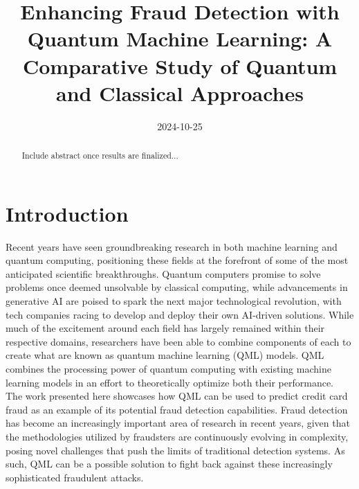 \documentclass[11pt, oneside]{article}   	%
\title{Enhancing Fraud Detection with Quantum Machine Learning: A Comparative Study of Quantum and Classical Approaches}
\author{}
\date{2024-10-25}							%
\begin{document}
\maketitle




\begin{abstract}
Include abstract once results are finalized...
\end{abstract}




\section{Introduction}

\hspace{10mm}Recent years have seen groundbreaking research in both machine learning and quantum computing, positioning these fields at the forefront of some of the most anticipated scientific breakthroughs. Quantum computers promise to solve problems once deemed unsolvable by classical computing, while advancements in generative AI are poised to spark the next major technological revolution, with tech companies racing to develop and deploy their own AI-driven solutions. While much of the excitement around each field has largely remained within their respective domains, researchers have been able to combine components of each to create what are known as quantum machine learning (QML) models. QML combines the processing power of quantum computing with existing machine learning models in an effort to theoretically optimize both their performance.\\

\noindent\hspace{10mm}The work presented here showcases how QML can be used to predict credit card fraud as an example of its potential fraud detection capabilities. Fraud detection has become an increasingly important area of research in recent years, given that the methodologies utilized by fraudsters are continuously evolving in complexity, posing novel challenges that push the limits of traditional detection systems. As such, QML can be a possible solution to fight back against these increasingly sophisticated fraudulent attacks. \\
\end{document}

